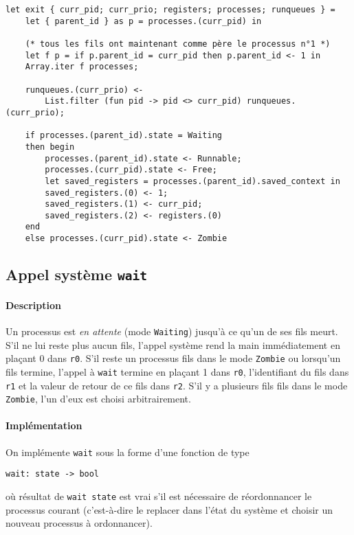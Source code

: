 \documentclass[french, toc]{../cs-classes/cs-classes}
\begin{document}
\begin{verbatim}
let exit { curr_pid; curr_prio; registers; processes; runqueues } =
    let { parent_id } as p = processes.(curr_pid) in

    (* tous les fils ont maintenant comme père le processus n°1 *)
    let f p = if p.parent_id = curr_pid then p.parent_id <- 1 in
    Array.iter f processes;

    runqueues.(curr_prio) <-
        List.filter (fun pid -> pid <> curr_pid) runqueues.(curr_prio);

    if processes.(parent_id).state = Waiting
    then begin
        processes.(parent_id).state <- Runnable;
        processes.(curr_pid).state <- Free;
        let saved_registers = processes.(parent_id).saved_context in
        saved_registers.(0) <- 1;
        saved_registers.(1) <- curr_pid;
        saved_registers.(2) <- registers.(0)
    end
    else processes.(curr_pid).state <- Zombie
\end{verbatim}

\subsection{Appel système \texttt{wait}}
\paragraph*{Description} 
Un processus est \emph{en attente} (mode \texttt{Waiting}) jusqu'à ce qu'un de ses fils meurt. S'il ne lui reste plus aucun fils, l'appel système rend la main immédiatement en plaçant 0 dans \texttt{r0}. S'il reste un processus fils dans le mode \texttt{Zombie} ou lorsqu'un fils termine, l'appel à \texttt{wait} termine en plaçant 1 dans \texttt{r0}, l'identifiant du fils dans \texttt{r1} et la valeur de retour de ce fils dans \texttt{r2}. S'il y a plusieurs fils fils dans le mode \texttt{Zombie}, l'un d'eux est choisi arbitrairement.

\paragraph*{Implémentation} On implémente \texttt{wait} sous la forme d'une fonction de type
\begin{center}
    \texttt{wait: state -> bool}
\end{center}
où résultat de \texttt{wait state} est vrai s’il est nécessaire de réordonnancer le processus courant (c’est-à-dire le replacer dans l’état du système et choisir un nouveau processus à ordonnancer).
\end{document}
